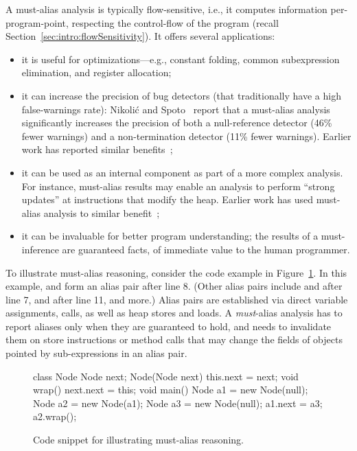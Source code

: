 A must-alias analysis is typically flow-sensitive, i.e., it computes information per-program-point, respecting the control-flow of the program (recall Section~\ref{sec:intro:flowSensitivity}). It offers several applications:

\begin{itemize}
\item it is useful for optimizations---e.g., constant folding, common subexpression elimination, and register allocation;
\item it can increase the precision of bug detectors (that traditionally have a high false-warnings rate): Nikoli\'{c} and Spoto~\cite{ictac:2012:Nikolic} report that a must-alias analysis significantly increases the precision of both a null-reference detector (46\% fewer warnings) and a non-termination detector (11\% fewer warnings). Earlier work has reported similar benefits~\cite{isola:2008:Ma};
\item it can be used as an internal component as part of a more complex analysis. For instance, must-alias results may enable an analysis to perform ``strong updates'' at instructions that modify the heap. Earlier work has used must-alias analysis to similar benefit~\cite{pldi:1994:Emami,popl:1998:Jagannathan};
\item it can be invaluable for better program understanding; the results of a must-inference are guaranteed facts, of immediate value to the human programmer.
\end{itemize}

To illustrate must-alias reasoning, consider the code example in Figure~\ref{fig:must-logic:snippet}. In this example,  and  form an alias pair after line 8. (Other alias pairs include  and  after line 7,  and  after line 11, and more.) Alias pairs are established via direct variable assignments, calls, as well as heap stores and loads. A \emph{must}-alias analysis has to report aliases only when they are guaranteed to hold, and needs to invalidate them on store instructions or method calls that may change the fields of objects pointed by sub-expressions in an alias pair.

\begin{figure}[htp]
\begin{javacode}
class Node {
	Node next;
	Node(Node next) { this.next = next;	}
	void wrap() { next.next = this;	}
}
void main() {
	Node a1 = new Node(null);
	Node a2 = new Node(a1);
	Node a3 = new Node(null);
	a1.next = a3;
	a2.wrap();
}
\end{javacode}
\caption{Code snippet for illustrating must-alias reasoning.}
\label{fig:must-logic:snippet}
\end{figure}

